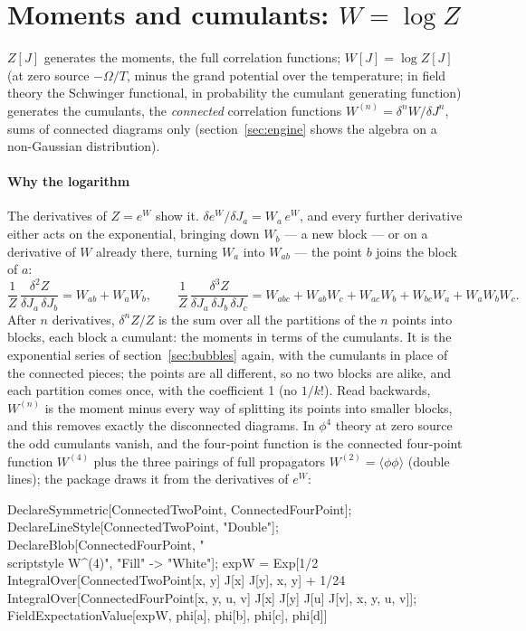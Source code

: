 \documentclass[11pt,a4paper]{article}
\begin{document}
\section{Moments and cumulants: \texorpdfstring{$W=\log Z$}{W = log Z}}\label{sec:cumulants}

$Z[J]$ generates the moments, the full correlation functions; $W[J]=\log Z[J]$ (at zero source $-\Omega/T$, minus the
grand potential over the temperature; in field theory the Schwinger functional, in probability the cumulant generating
function) generates the cumulants, the
\emph{connected} correlation functions $W^{(n)}=\delta^nW/\delta J^n$, sums of connected diagrams only
(section~\ref{sec:engine} shows the algebra on a non-Gaussian distribution).

\paragraph{Why the logarithm} The derivatives of $Z=e^W$ show it. $\delta e^W/\delta J_a=W_a\,e^W$, and every further derivative
either acts on the exponential, bringing down $W_b$ --- a new block --- or on a derivative of $W$ already there, turning $W_a$
into $W_{ab}$ --- the point $b$ joins the block of $a$:
\[
\frac1Z\,\frac{\delta^2Z}{\delta J_a\,\delta J_b}=W_{ab}+W_aW_b,\qquad
\frac1Z\,\frac{\delta^3Z}{\delta J_a\,\delta J_b\,\delta J_c}=W_{abc}+W_{ab}W_c+W_{ac}W_b+W_{bc}W_a+W_aW_bW_c.
\]
After $n$ derivatives, $\delta^nZ/Z$ is the sum over all the partitions of the $n$ points into blocks, each block a
cumulant: the moments in terms of the cumulants. It is the exponential series of section~\ref{sec:bubbles} again, with
the cumulants in place of the connected pieces; the points are all different, so no two blocks are alike, and each
partition comes once, with the coefficient 1 (no $1/k!$). Read
backwards, $W^{(n)}$ is the moment minus every way of splitting its points into smaller blocks, and this removes exactly
the disconnected diagrams. In $\phi^4$ theory at zero source the odd cumulants vanish, and the four-point function is the
connected four-point function $W^{(4)}$ plus the three pairings of full propagators $W^{(2)}=\langle\phi\phi\rangle$ (double
lines); the package draws it from the derivatives of $e^W$:
\begin{code}
DeclareSymmetric[ConnectedTwoPoint, ConnectedFourPoint];
DeclareLineStyle[ConnectedTwoPoint, "Double"];
DeclareBlob[ConnectedFourPoint, "\\scriptstyle W^{(4)}", "Fill" -> "White"];
expW = Exp[1/2 IntegralOver[ConnectedTwoPoint[x, y] J[x] J[y], {x, y}] +
    1/24 IntegralOver[ConnectedFourPoint[x, y, u, v] J[x] J[y] J[u] J[v],
        {x, y, u, v}]];
FieldExpectationValue[expW, {phi[a], phi[b], phi[c], phi[d]}]
\end{code}
\end{document}
